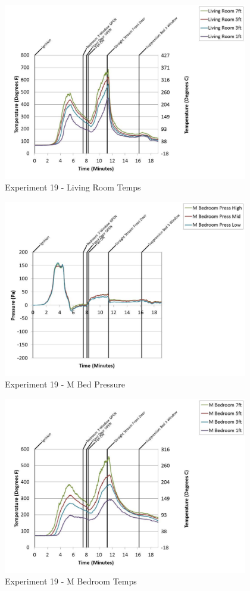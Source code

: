 \documentclass{article}
\begin{document}
\begin{appendices}
	\begin{figure}[h!]
		\centering
		\includegraphics[height=3.05in]{0_Images/Results_Charts/Exp_19_Charts/LivingRoomTemps.pdf}
		\caption{Experiment 19 - Living Room Temps}
	\end{figure}
 
	\clearpage

	\begin{figure}[h!]
		\centering
		\includegraphics[height=3.05in]{0_Images/Results_Charts/Exp_19_Charts/MBedPressure.pdf}
		\caption{Experiment 19 - M Bed Pressure}
	\end{figure}
 

	\begin{figure}[h!]
		\centering
		\includegraphics[height=3.05in]{0_Images/Results_Charts/Exp_19_Charts/MBedroomTemps.pdf}
		\caption{Experiment 19 - M Bedroom Temps}
	\end{figure}
 

\end{appendices}
\end{document}
